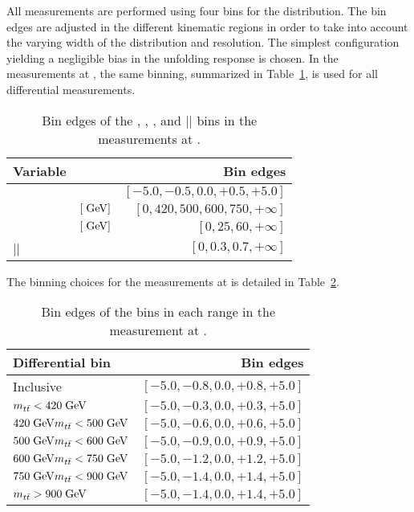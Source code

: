 All measurements are performed using four bins for the \dy{}
distribution.
The bin edges are adjusted in the different kinematic regions in order
to take into account the varying width of the distribution and \dy{}
resolution. The simplest configuration yielding a negligible bias in
the unfolding response is chosen. In the measurements at \seventev{},
the same \dy{} binning, summarized in Table~\ref{tab:unf:binning7tev},
is used for all differential measurements. 
\begin{table}[htbp]
  \begin{center}
    \begin{tabular}{l l r}
      \toprule
      Variable & & Bin edges \\
      \midrule
      \dy{}         &            & $[-5.0, -0.5, 0.0, +0.5, +5.0]$ \\
      \mtt{}        & $[\; \mathrm{GeV}{}]$ & $[0, 420, 500, 600, 750,
      +\infty{}]$ \\
      \pttt{}       & $[\; \mathrm{GeV}{}]$ & $[0, 25, 60, +\infty{}]$ \\
      |\ytt{}|     &            & $[0, 0.3, 0.7, +\infty{}]$ \\
      \bottomrule
     \end{tabular}
   \end{center}
  \caption{Bin edges of the \dy{}, \mtt{}, \pttt{}, and |\ytt{}|
  bins in the measurements at \seventev{}.}
  \label{tab:unf:binning7tev}
\end{table}
The binning choices for the measurements at \eighttev{} is detailed in
Table~\ref{tab:unf:binning8tev}.
\begin{table}[htbp]
  \begin{center}
    \begin{tabular}{l r}
      \toprule
      Differential bin & Bin edges \\
      \midrule
      Inclusive & $[-5.0, -0.8, 0.0, +0.8, +5.0]$ \\
      \midrule
      $m_{t\bar{t}}{}<420\; \mathrm{GeV}{}$ & $[-5.0, -0.3, 0.0, +0.3, +5.0]$ \\
      $420\; \mathrm{GeV}{}m_{t\bar{t}}{}<500\; \mathrm{GeV}{}$ & $[-5.0, -0.6, 0.0, +0.6, +5.0]$ \\
      $500\; \mathrm{GeV}{}m_{t\bar{t}}{}<600\; \mathrm{GeV}{}$ & $[-5.0, -0.9, 0.0, +0.9, +5.0]$ \\
      $600\; \mathrm{GeV}{}m_{t\bar{t}}{}<750\; \mathrm{GeV}{}$ & $[-5.0, -1.2, 0.0, +1.2, +5.0]$ \\
      $750\; \mathrm{GeV}{}m_{t\bar{t}}{}<900\; \mathrm{GeV}{}$ & $[-5.0, -1.4, 0.0, +1.4, +5.0]$ \\
      $m_{t\bar{t}}{}>900\; \mathrm{GeV}{}$ & $[-5.0, -1.4, 0.0, +1.4, +5.0]$ \\
      \bottomrule
     \end{tabular}
   \end{center}
  \caption{Bin edges of the \dy{} bins in each \mtt{} range in the
    measurement at \eighttev{}.}
  \label{tab:unf:binning8tev}
\end{table}

